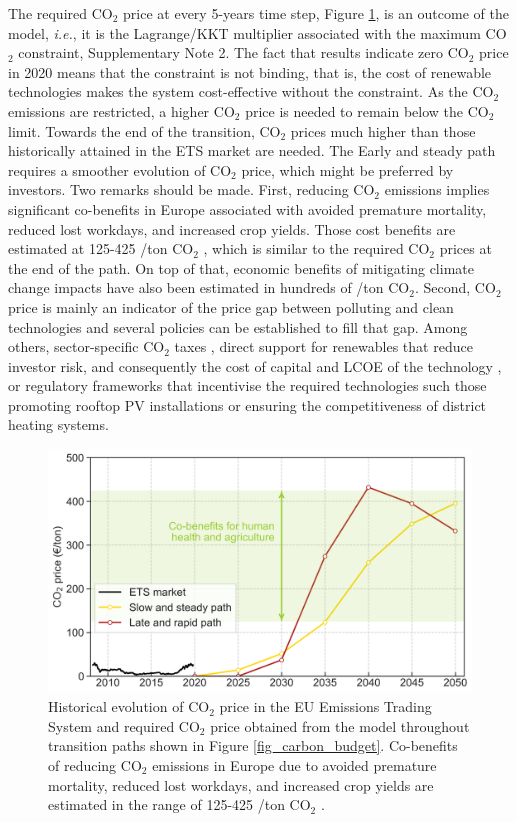 \documentclass[5p]{elsarticle} %
\begin{document}
The required CO$_2$ price at every 5-years time step, Figure \ref{fig_co2price}, is an outcome of the model, \textit{i.e.}, it is the Lagrange/KKT multiplier associated with the maximum CO$_2$ constraint, Supplementary Note 2. The fact that results indicate zero CO$_2$ price in 2020 means that the constraint is not binding, that is, the cost of renewable technologies makes the system cost-effective without the constraint. As the CO$_2$ emissions are restricted, a higher CO$_2$ price is needed to remain below the CO$_2$  limit. Towards the end of the transition, CO$_2$ prices much higher than those historically attained in the ETS market are needed. The Early and steady path requires a smoother evolution of CO$_2$ price, which might be preferred by investors. Two remarks should be made. First, reducing CO$_2$ emissions implies significant co-benefits in Europe associated with avoided premature mortality, reduced lost workdays, and increased crop yields. Those cost benefits are estimated at 125-425 \EUR/ton CO$_2$ \cite{Vandyck_2018}, which is similar to the required CO$_2$ prices at the end of the path. On top of that, economic benefits of mitigating climate change impacts have also been estimated in hundreds of \EUR/ton CO$_2$. Second, CO$_2$ price is mainly an indicator of the price gap between polluting and clean technologies and several policies can be established to fill that gap. Among others, sector-specific CO$_2$ taxes \cite{Carbon_pricing_2019}, direct support for renewables that reduce investor risk, and consequently the cost of capital and LCOE of the technology \cite{Vartiainen_2019}, or regulatory frameworks that incentivise the required technologies such those promoting rooftop PV installations or ensuring the competitiveness of district heating systems. 

\begin{figure}[!h]
\centering
\includegraphics[width=\columnwidth]{../figures/co2_price.png}
\caption{Historical evolution of CO$_2$ price in the EU Emissions Trading System \cite{ETS} and required CO$_2$ price obtained from the model throughout transition paths shown in Figure \ref{fig_carbon_budget}. 
Co-benefits of reducing CO$_2$ emissions in Europe due to avoided premature mortality, reduced lost workdays, and increased crop yields are estimated in the range of 125-425 \EUR/ton CO$_2$ \cite{Vandyck_2018}.} \label{fig_co2price} 
\end{figure}
\end{document}
